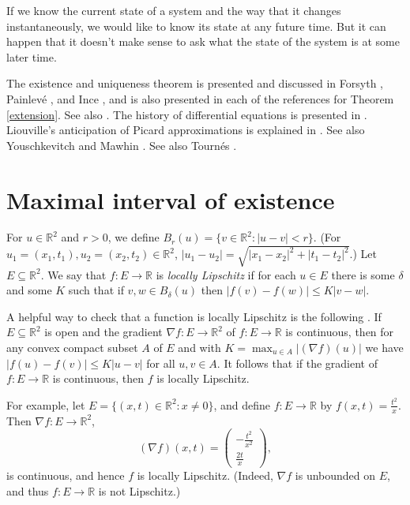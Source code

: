 \documentclass{article}
\theoremstyle{definition}
\begin{document}
If we know the current state of a system and the way that it changes instantaneously, we would like to know
its state at any future time. But it can happen that it doesn't make sense to ask what  the state of the system is at some later time. 


The existence and uniqueness theorem is presented and discussed in 
 Forsyth \cite[pp. 26--41, Chapter II]{forsyth}, Painlev\'e \cite{painleve}, and Ince \cite{ince}, and is also presented
in each of the references for Theorem \ref{extension}. See also \cite{roberts}. The history of differential equations is presented in \cite{archibald}. Liouville's
anticipation of Picard approximations is explained in \cite[p.~448, \S 32]{lutzen}.
See also Youschkevitch \cite{MR661918} and Mawhin \cite{mawhin}. See also Tourn\'es \cite{tournes}.


\section{Maximal interval of existence}
For $u \in \mathbb{R}^2$ and $r>0$, we define $B_r(u)=\{v \in \mathbb{R}^2: |u-v| < r\}$.
(For $u_1=(x_1,t_1), u_2=(x_2,t_2) \in \mathbb{R}^2$, $|u_1-u_2|=\sqrt{|x_1-x_2|^2+|t_1-t_2|^2}$.)
Let $E \subseteq \mathbb{R}^2$. We say that $f:E \to \mathbb{R}$ is {\em locally Lipschitz} if for each $u \in E$
there is some $\delta$ and some $K$  such that if $v,w \in B_\delta(u)$ then $|f(v)-f(w)| \leq K|v-w|$. 

A helpful way to check that a function is locally Lipschitz is the following \cite[p.~218, Theorem]{arnold}. If $E \subseteq \mathbb{R}^2$ is open
and the gradient $\nabla f:E \to \mathbb{R}^2$ of $f:E \to \mathbb{R}$ is continuous, then for
any convex compact subset $A$ of $E$ and  with $K=\max_{u \in A} |(\nabla f)(u)|$ we have
$|f(u)-f(v)| \leq K|u-v|$ for all $u,v \in A$. It follows that if the gradient of $f:E \to \mathbb{R}$ is continuous, then $f$ is locally Lipschitz.

For example, let $E=\{(x,t) \in \mathbb{R}^2: x \neq 0\}$, and define $f:E \to \mathbb{R}$ by $f(x,t)=\frac{t^2}{x}$. 
Then $\nabla f:E \to \mathbb{R}^2$,
\[
(\nabla f)(x,t)=\begin{pmatrix}-\frac{t^2}{x^2}\\ \frac{2t}{x} \end{pmatrix},
\]
is continuous, and hence $f$ is locally Lipschitz. (Indeed, $\nabla f$ is  unbounded on $E$, and thus $f:E \to \mathbb{R}$ is not Lipschitz.)
\end{document}
